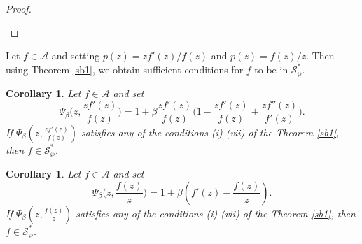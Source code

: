 \documentclass[12pt, reqno]{amsart}
\numberwithin{equation}{section}
\theoremstyle{plain}
\newtheorem{corollary}[theorem]{Corollary}
\theoremstyle{definition}
\theoremstyle{remark}
\begin{document}
\begin{proof}
\begin{itemize}
	\end{itemize}
\end{proof}

Let $f\in\mathcal{A}$ and setting $p(z)=zf'(z)/f(z)$ and $p(z)=f(z)/z$. Then using Theorem \ref{sb1}, we obtain sufficient conditions for $f$ to be in $\mathcal{S}^*_{\wp}$.

\begin{corollary}
	Let $f\in \mathcal{A}$ and set
	\begin{equation*}
	\Psi_\beta\biggl(z,\frac{zf'(z)}{f(z)}\biggl)=1+\beta\frac{zf'(z)}{f(z)}\biggl(1-\frac{zf'(z)}{f(z)}+\frac{zf''(z)}{f'(z)}\biggl).
	\end{equation*}
	If $ \Psi_\beta\left(z,\frac{zf'(z)}{f(z)}\right)$ satisfies any of the conditions (i)-(vii) of the Theorem \ref{sb1}, then $ f\in \mathcal{S}^*_{\wp} $.
\end{corollary}
\begin{corollary}
	Let $f\in \mathcal{A}$ and set
	\begin{equation*}
	\Psi_\beta\biggl(z,\frac{f(z)}{z}\biggl)=1+\beta\left(f'(z)-\frac{f(z)}{z}\right).
	\end{equation*}
	If $ \Psi_\beta\left(z,\frac{f(z)}{z}\right)$ satisfies any of the conditions (i)-(vii) of the Theorem \ref{sb1}, then $ f\in \mathcal{S}^*_{\wp} $.
\end{corollary}
\end{document}
